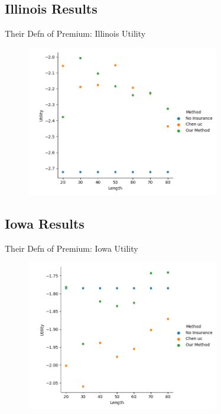 \documentclass{beamer}
\begin{document}
\subsection*{Illinois Results}
\begin{frame}{Their Defn of Premium: Illinois Utility}
    \begin{figure}
        \includegraphics[width=0.75\textwidth]{../../../output/figures/Chen Premium/Illinois_Utility_Length_ml1241.png}
    \end{figure}
\end{frame}

\subsection*{Iowa Results}
\begin{frame}{Their Defn of Premium: Iowa Utility}
    \begin{figure}
        \includegraphics[width=0.75\textwidth]{../../../output/figures/Chen Premium/Iowa_Utility_Length_ml1241.png}
    \end{figure}
\end{frame}
\end{document}
